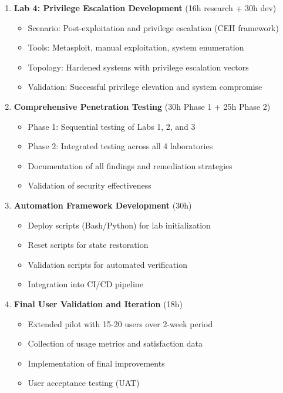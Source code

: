 \begin{enumerate}

\item \textbf{Lab 4: Privilege Escalation Development} (16h research + 30h dev)
\begin{itemize}
\item Scenario: Post-exploitation and privilege escalation (CEH framework)
\item Tools: Metasploit, manual exploitation, system enumeration
\item Topology: Hardened systems with privilege escalation vectors
\item Validation: Successful privilege elevation and system compromise
\end{itemize}

\item \textbf{Comprehensive Penetration Testing} (30h Phase 1 + 25h Phase 2)
\begin{itemize}
\item Phase 1: Sequential testing of Labs 1, 2, and 3
\item Phase 2: Integrated testing across all 4 laboratories
\item Documentation of all findings and remediation strategies
\item Validation of security effectiveness
\end{itemize}

\item \textbf{Automation Framework Development} (30h)
\begin{itemize}
\item Deploy scripts (Bash/Python) for lab initialization
\item Reset scripts for state restoration
\item Validation scripts for automated verification
\item Integration into CI/CD pipeline
\end{itemize}

\item \textbf{Final User Validation and Iteration} (18h)
\begin{itemize}
\item Extended pilot with 15-20 users over 2-week period
\item Collection of usage metrics and satisfaction data
\item Implementation of final improvements
\item User acceptance testing (UAT)
\end{itemize}


\end{enumerate}
